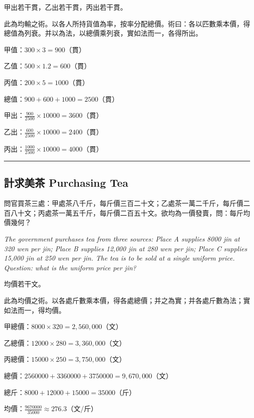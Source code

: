 \documentclass[11pt,a4paper]{article}
\newcommand{\longline}{\noindent\rule{\textwidth}{0.4pt}}
\begin{document}
\begin{answer}
甲出若干貫，乙出若干貫，丙出若干貫。
\end{answer}

\begin{method}
此為均輸之術。以各人所持貨值為率，按率分配總價。術曰：各以匹數乘本價，得總值為列衰。并以為法，以總價乘列衰，實如法而一，各得所出。
\end{method}

\begin{working}
甲值：$300 \times 3 = 900$（貫）

乙值：$500 \times 1.2 = 600$（貫）

丙值：$200 \times 5 = 1000$（貫）

總值：$900 + 600 + 1000 = 2500$（貫）

甲出：$\displaystyle\frac{900}{2500} \times 10000 = 3600$（貫）

乙出：$\displaystyle\frac{600}{2500} \times 10000 = 2400$（貫）

丙出：$\displaystyle\frac{1000}{2500} \times 10000 = 4000$（貫）
\end{working}

\vspace{0.5em}
\longline

\subsection{計求美茶 \quad Purchasing Tea}

\begin{problem}
問官買茶三處：甲處茶八千斤，每斤價三百二十文；乙處茶一萬二千斤，每斤價二百八十文；丙處茶一萬五千斤，每斤價二百五十文。欲均為一價發賣，問：每斤均價幾何？

\textit{The government purchases tea from three sources: Place A supplies 8000 jin at 320 wen per jin; Place B supplies 12,000 jin at 280 wen per jin; Place C supplies 15,000 jin at 250 wen per jin. The tea is to be sold at a single uniform price. Question: what is the uniform price per jin?}
\end{problem}

\begin{answer}
均價若干文。
\end{answer}

\begin{method}
此為均價之術。以各處斤數乘本價，得各處總價；并之為實；并各處斤數為法；實如法而一，得均價。
\end{method}

\begin{working}
甲總價：$8000 \times 320 = 2{,}560{,}000$（文）

乙總價：$12000 \times 280 = 3{,}360{,}000$（文）

丙總價：$15000 \times 250 = 3{,}750{,}000$（文）

總價：$2560000 + 3360000 + 3750000 = 9{,}670{,}000$（文）

總斤：$8000 + 12000 + 15000 = 35000$（斤）

均價：$\displaystyle\frac{9670000}{35000} \approx 276.3$（文/斤）
\end{working}
\end{document}
